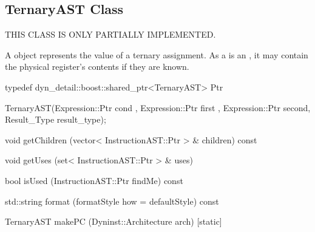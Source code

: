 \subsection{TernaryAST Class}
\label{sec:TernaryAST}

THIS CLASS IS ONLY PARTIALLY IMPLEMENTED.


A  object represents the value of a ternary assignment. As a 
is an , it may contain the physical register's contents if they
are known.

\begin{apient}
  typedef dyn\_detail::boost::shared\_ptr<TernaryAST> Ptr
\end{apient}

\begin{apient}
  TernaryAST(Expression::Ptr cond , Expression::Ptr first , Expression::Ptr second, Result_Type result_type);
\end{apient}

\begin{apient}
  void getChildren (vector< InstructionAST::Ptr > & children) const
\end{apient}

\begin{apient}
  void getUses (set< InstructionAST::Ptr > & uses)
\end{apient}

\begin{apient}
  bool isUsed (InstructionAST::Ptr findMe) const
\end{apient}

\begin{apient}
  std::string format (formatStyle how = defaultStyle) const
\end{apient}

\begin{apient}
  TernaryAST makePC (Dyninst::Architecture arch) [static]
\end{apient}

